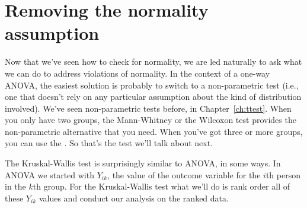 \section{Removing the normality assumption~\label{sec:kruskalwallis}}

Now that we've seen how to check for normality, we are led naturally to ask what we can do to address violations of normality. In the context of a one-way ANOVA, the easiest solution is probably to switch to a non-parametric test (i.e., one that doesn't rely on any particular assumption about the kind of distribution involved). We've seen non-parametric tests before, in Chapter~\ref{ch:ttest}. When you only have two groups, the Mann-Whitney or the Wilcoxon test provides the non-parametric alternative that you need. When you've got three or more groups, you can use the  \parencite{KruskalWallis1952}. So that's the test we'll talk about next.


The Kruskal-Wallis test is surprisingly similar to ANOVA, in some ways. In ANOVA we started with $Y_{ik}$, the value of the outcome variable for the $i$th person in the $k$th group. For the Kruskal-Wallis test what we'll do is rank order all of these $Y_{ik}$ values and conduct our analysis on the ranked data. 

